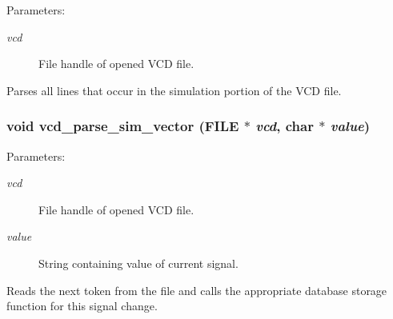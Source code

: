 \begin{Desc}
\item[Parameters: ]\par
\begin{description}
\item[{\em 
vcd}]File handle of opened VCD file.\end{description}
\end{Desc}
Parses all lines that occur in the simulation portion of the VCD file. 
\subsubsection{\setlength{\rightskip}{0pt plus 5cm}void vcd\_\-parse\_\-sim\_\-vector (FILE $\ast$ {\em vcd}, char $\ast$ {\em value})}\label{vcd_8c_a4}


\begin{Desc}
\item[Parameters: ]\par
\begin{description}
\item[{\em 
vcd}]File handle of opened VCD file. \item[{\em 
value}]String containing value of current signal.\end{description}
\end{Desc}
Reads the next token from the file and calls the appropriate database storage function for this signal change. 